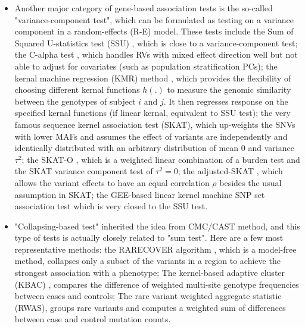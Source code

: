 \documentclass[12pt]{article}
\begin{document}
\begin{itemize}
\item Another major category of gene-based association tests is the so-called "variance-component test", which can be formulated as testing on a variance component in a random-effects (R-E) model. These tests include the Sum of Squared U-statistics test (SSU) \cite{Pan2009}, which is close to a variance-component test; the C-alpha test \cite{Neale2011}, which handles RVs with mixed effect direction well but not able to adjust for covariates (such as population stratification PCs); the kernal machine regression (KMR) method \cite{Wu2010,Kwee2008}, which provides the flexibility of choosing different kernal functions $h(.)$ to measure the genomic similarity between the genotypes of subject $i$ and $j$. It then regresses response on the specified kernal functions (if linear kernal, equivalent to SSU test); the very famous sequence kernel association test (SKAT)\cite{Wu2011}, which up-weights the SNVs with lower MAFs and assumes the effect of variants are independently and identically distributed with an arbitrary distribution of mean 0 and variance $\tau^2$; the SKAT-O \cite{Lee2012a,Lee2012}, which is a weighted linear combination of a burden test and the SKAT variance component test of $\tau^2 = 0$; the adjusted-SKAT \cite{Oualkacha2013}, which allows the variant effects to have an equal correlation $\rho$ besides the usual assumption in SKAT; the GEE-based linear kernel machine SNP set association test \cite{Wang2013} which is very closed to the SSU test.
\item "Collapsing-based test" inherited the idea from CMC/CAST method, and this type of tests is actually closely related to "sum test". Here are a few most representative methods: the RARECOVER algorithm \cite{Bhatia2010}, which is a model-free method, collapses only a subset of the variants in a region to achieve the strongest association with a phenotype; The kernel-based adaptive cluster (KBAC) \cite{Liu2010}, compares the difference of weighted multi-site genotype frequencies between cases and controls; The rare variant weighted aggregate statistic (RWAS)\cite{Sul2011}, groups rare variants and computes a weighted sum of differences between case and control mutation counts.  

\end{itemize}
\end{document}
